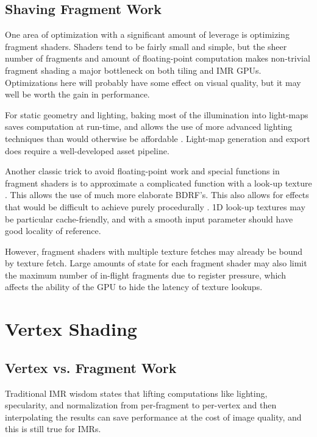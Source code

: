 \subsection{Shaving Fragment Work}
\label{Jon-McCaffrey-Shaving-Fragment-Work}

One area of optimization with a significant amount of leverage is optimizing
fragment shaders.  Shaders tend to be fairly small and simple, but the sheer
number of fragments and amount of floating-point computation makes non-trivial
fragment shading a major bottleneck on both tiling and IMR GPUs.  Optimizations
here will probably have some effect on visual quality, but it may well be worth
the gain in performance.

For static geometry and lighting, baking most of the illumination into
light-maps saves computation at run-time, and allows the use of more advanced
lighting techniques than would otherwise be affordable \cite{Miller99}
\cite{Unity11}.  Light-map generation and export does require a well-developed
asset pipeline.

Another classic trick to avoid floating-point work and special functions in
fragment shaders is to approximate a complicated function with a look-up
texture \cite{Pranckevicius11b}.  This allows the use of much more elaborate
BDRF's.  This also allows for effects that would be difficult to achieve purely
procedurally \cite{Mitchell07}.  1D look-up textures may be particular
cache-friendly, and with a smooth input parameter should have good locality of
reference.  

However, fragment shaders with multiple texture fetches may already be bound
by
 texture fetch.  Large amounts of state for each fragment shader may also
limit the maximum
 number of in-flight fragments due to register pressure,
which affects the
 ability of the GPU to hide the latency of texture lookups.

\section{Vertex Shading}
\subsection{Vertex vs. Fragment Work}
\label{Jon-McCaffrey-Vertex-vs-Fragment-Work}

Traditional IMR wisdom states that lifting computations like lighting,
specularity, and normalization from per-fragment to per-vertex and then
interpolating the results can save performance at the cost of image quality,
and this is still true for IMRs.

